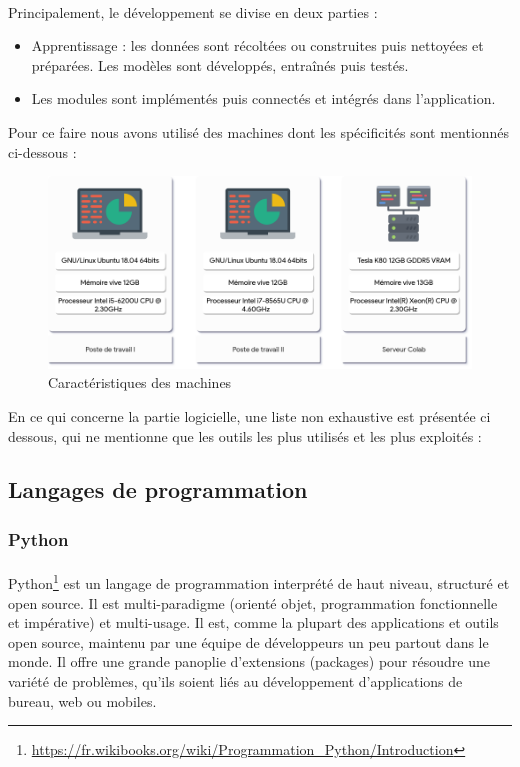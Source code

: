 	\paragraph{}
	Principalement, le développement se divise en deux parties : 
	\begin{itemize}
		\item Apprentissage : les données sont récoltées ou construites puis nettoyées et préparées. Les modèles sont développés, entraînés puis testés.
		\item Les modules sont implémentés puis connectés et intégrés dans l'application.
	\end{itemize}
	\par Pour ce faire nous avons utilisé des machines dont les spécificités sont mentionnés ci-dessous :
	\begin{figure}[H] 
		\centering
		\includegraphics[width=0.88\linewidth]{images/implementation/machines.png}
		\caption{Caractéristiques des machines}
		\label{fig:machines}
		
	\end{figure}
	\par
	En ce qui concerne la partie logicielle, une liste non exhaustive est présentée ci dessous, qui ne mentionne que les outils les plus utilisés et les plus exploités :
	\subsection{Langages de programmation}
		\subsubsection*{Python}
		\label{python}
		\paragraph{}
		 Python\footnote{\url{https://fr.wikibooks.org/wiki/Programmation_Python/Introduction}} est un langage de programmation interprété de haut niveau, structuré et open source. Il est multi-paradigme (orienté objet, programmation fonctionnelle et impérative) et multi-usage. Il est, comme la plupart des applications et outils open source, maintenu par une équipe de développeurs un peu partout dans le monde. Il offre une grande panoplie d'extensions (packages) pour résoudre une variété de problèmes, qu'ils soient liés au développement d'applications de bureau, web ou mobiles.
		

